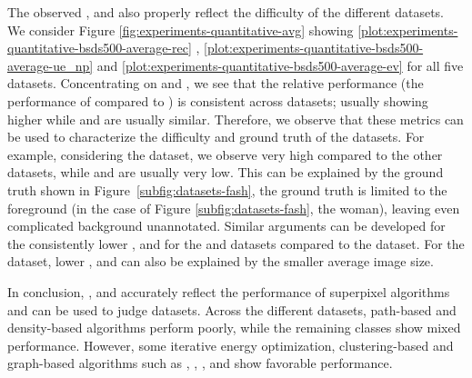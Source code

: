The observed \ARec, \AUE and \AEV also properly reflect the difficulty of the different datasets. We
consider Figure \ref{fig:experiments-quantitative-avg} showing \ref{plot:experiments-quantitative-bsds500-average-rec} \ARec,
\ref{plot:experiments-quantitative-bsds500-average-ue_np} \AUE and \ref{plot:experiments-quantitative-bsds500-average-ev}  \AEV for all five datasets.
Concentrating on \SEEDS and \ETPS, we see that the relative
performance (\ie the performance of \SEEDS compared to \ETPS) is consistent across
datasets; \SEEDS usually showing higher \AUE while \ARec and \AEV are usually similar.
Therefore, we observe that these metrics can be used to characterize
the difficulty and ground truth of the datasets. For example, considering
the \Fash dataset, we observe very high \AEV compared
to the other datasets, while \ARec and \AUE are usually very low. This can be
explained by the ground truth shown in Figure~\ref{subfig:datasets-fash},
\ie the ground truth is limited to the foreground (in the case of Figure \ref{subfig:datasets-fash}, the woman),
leaving even complicated background unannotated. Similar arguments can be developed
for the consistently lower \ARec, \AUE and \AEV for the \NYU and \SUNRGBD datasets compared to the \BSDS dataset.
For the \SBD dataset, lower \ARec, \AUE and \AEV can also be explained by the smaller average image size.

In conclusion, \ARec, \AUE and \AEV accurately reflect the performance of superpixel
algorithms and can be used to judge datasets. Across the different datasets, path-based
and density-based algorithms perform poorly, while the remaining classes show mixed
performance. However, some iterative energy optimization, clustering-based and
graph-based algorithms such as \ETPS, \SEEDS, \CRS, \ERS and \SLIC show favorable performance.

\begin{figure*}
	\centering
	\\
	\\
	\\
	\\
	
	\caption{\ARec, \AUE and \AEV (lower is better) on the used datasets.
    We find that \ARec, \AUE and \AEV appropriately
    summarize performance independent of the number of generated superpixels. Plausible
    examples to consider are top-performing algorithms such as \ETPS, \ERS, \SLIC or \CRS
    as well as poorly performing ones such as \QS and~\PF.
	\textbf{Best viewed in color.}}
	\label{fig:experiments-quantitative-avg}
\end{figure*}

